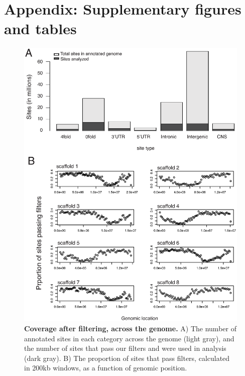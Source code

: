 \section{Appendix: Supplementary figures and tables}

\begin{figure}[ht!]
      \centering
       \includegraphics[width=\linewidth]{Ch2FigS1}
    \caption{\textbf{Coverage after filtering, across the genome.} A) The number of annotated sites in each category across the genome (light gray), and the number of sites that pass our filters and were used in analysis (dark gray). B) The proportion of sites that pass filters, calculated in 200kb windows, as a function of genomic position.}
    \label{fig:figS1}
\end{figure}

